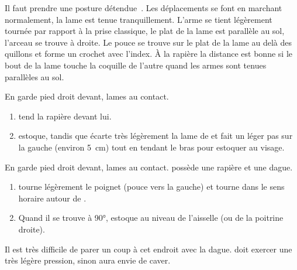 Il faut prendre une posture détendue~\footnotemark{}.%
Les déplacements se font en marchant normalement, la lame est tenue tranquillement.
L'arme se tient légèrement tournée par rapport à la prise classique, le plat de la lame est parallèle au sol, l'arceau se trouve à droite. Le pouce se trouve sur le plat de la lame au delà des quillons et forme un crochet avec l'index.
À la rapière la distance est bonne si le bout de la lame touche la coquille de l'autre quand les armes sont tenues parallèles au sol.


\begin{technique}

En garde pied droit devant, lames au contact.

\begin{enumerate}
	\item \A tend la rapière devant lui.
	\item \A estoque, tandis que \D écarte très légèrement la lame de \A et fait un léger pas sur la gauche (environ \SI{5}{cm}) tout en tendant le bras pour estoquer au visage.
\end{enumerate}

\end{technique}


\begin{technique}

En garde pied droit devant, lames au contact.
\D possède une rapière et une dague.

\begin{enumerate}
	\item \A tourne légèrement le poignet (pouce vers la gauche) et tourne dans le sens horaire autour de \D.
	\item Quand il se trouve à 90°, \A estoque \D au niveau de l'aisselle (ou de la poitrine droite).
\end{enumerate}

Il est très difficile de parer un coup à cet endroit avec la dague.
\A doit exercer une très légère pression, sinon \D aura envie de caver.

\end{technique}


